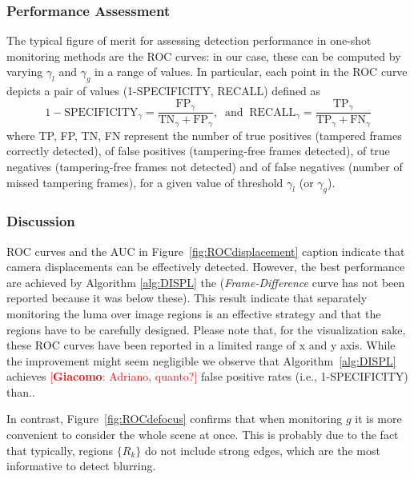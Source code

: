 \documentclass{llncs}
\newcommand{\gi}[1]{{\textcolor{red}{[\small \textbf{Giacomo}: #1]}}}
\begin{document}
\subsubsection{Performance Assessment}
The typical figure of merit for assessing detection performance in one-shot monitoring methods are the ROC curves: in our case, these can be computed by varying $\gamma_l$ and $\gamma_g$ in a range of values. In particular, each point in the ROC curve depicts a pair of values (1-SPECIFICITY, RECALL) defined as
\[1-\text{SPECIFICITY}_\gamma = \frac{\text{FP}_\gamma}{\text{TN}_\gamma+\text{FP}_\gamma}, \ \text{ and } \ \text{RECALL}_\gamma=\frac{\text{TP}_\gamma}{\text{TP}_\gamma+\text{FN}_\gamma}\]
where TP, FP, TN, FN represent the number of true positives (tampered frames correctly detected), of false positives (tampering-free frames detected), of true negatives (tampering-free frames not detected) and of false negatives (number of missed tampering frames), for a given value of threshold $\gamma_l$ (or $\gamma_g$).

\subsubsection{Discussion}
ROC curves and the AUC in Figure~\ref{fig:ROCdisplacement} caption indicate that camera displacements can be effectively detected. However, the best performance are achieved by Algorithm \ref{alg:DISPL} the (\emph{Frame-Difference} curve has not been reported because it was below these). This result indicate that separately monitoring the luma over image regions is an effective strategy and that the regions have to be carefully designed. Please note that, for the visualization sake, these ROC curves have been reported in a limited range of x and y axis. While the improvement might seem negligible we observe that Algorithm~\ref{alg:DISPL} achieves \gi{Adriano, quanto?} false positive rates (i.e., 1-SPECIFICITY) than..

In contrast, Figure~\ref{fig:ROCdefocus} confirms that when monitoring $g$ it is more convenient to consider the whole scene at once. This is probably due to the fact that typically, regions $\{R_k\}$ do not include strong edges, which are the most informative to detect blurring.
\end{document}
